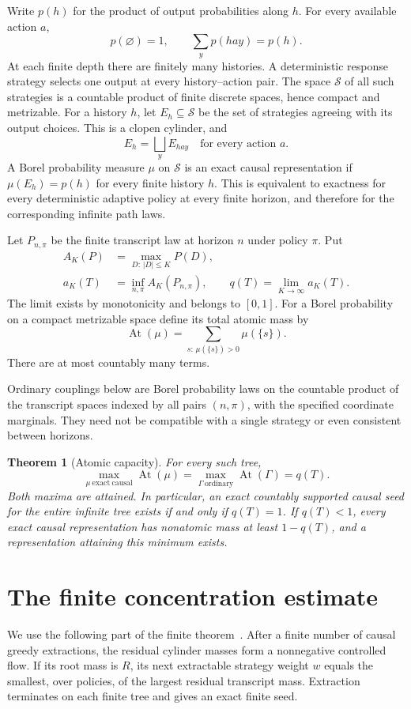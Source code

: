 \documentclass[11pt]{article}
\newtheorem{theorem}{Theorem}
\newcommand{\At}{\operatorname{At}}
\newcommand{\cS}{\mathcal S}
\begin{document}
Write $p(h)$ for the product of output probabilities along $h$.
For every available action $a$,
\[
 p(\varnothing)=1,\qquad \sum_y p(hay)=p(h).
\]
At each finite depth there are finitely many histories. A deterministic
response strategy selects one output at every history--action pair.
The space $\cS$ of all such strategies is a countable product of finite
discrete spaces, hence compact and metrizable. For a history $h$, let
$E_h\subseteq\cS$ be the set of strategies agreeing with its output
choices. This is a clopen cylinder, and
\[
 E_h=\bigsqcup_y E_{hay}\quad\text{for every action }a.
\]
A Borel probability measure $\mu$ on $\cS$ is an exact causal
representation if $\mu(E_h)=p(h)$ for every finite history $h$.
This is equivalent to exactness for every deterministic adaptive policy
at every finite horizon, and therefore for the corresponding infinite
path laws.

Let $P_{n,\pi}$ be the finite transcript law at horizon $n$ under policy
$\pi$. Put
\begin{align}
 A_K(P)&=\max_{D:\,|D|\le K}P(D),\\
 a_K(T)&=\inf_{n,\pi} A_K(P_{n,\pi}),\qquad
 q(T)=\lim_{K\to\infty}a_K(T).\label{eq:q}
\end{align}
The limit exists by monotonicity and belongs to $[0,1]$.
For a Borel probability on a compact metrizable space define its total
atomic mass by
\[
 \At(\mu)=\sum_{s:\,\mu(\{s\})>0}\mu(\{s\}).
\]
There are at most countably many terms.

Ordinary couplings below are Borel probability laws on the countable
product of the transcript spaces indexed by all pairs $(n,\pi)$, with
the specified coordinate marginals. They need not be compatible with a
single strategy or even consistent between horizons.

\begin{theorem}[Atomic capacity]\label{th:main}
For every such tree,
\[
 \boxed{\quad
 \max_{\mu\ \mathrm{exact\ causal}}\At(\mu)
 =\max_{\Gamma\ \mathrm{ordinary}}\At(\Gamma)
 =q(T).\quad}
\]
Both maxima are attained. In particular, an exact countably supported
causal seed for the entire infinite tree exists if and only if $q(T)=1$.
If $q(T)<1$, every exact causal representation has nonatomic mass at
least $1-q(T)$, and a representation attaining this minimum exists.
\end{theorem}

\section{The finite concentration estimate}
We use the following part of the finite theorem~\cite{repo}. After a
finite number of causal greedy extractions, the residual cylinder masses
form a nonnegative controlled flow. If its root mass is $R$, its next
extractable strategy weight $w$ equals the smallest, over policies, of
the largest residual transcript mass. Extraction terminates on each
finite tree and gives an exact finite seed.
\end{document}
